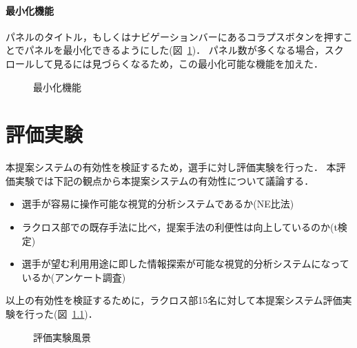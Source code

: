 \documentclass[sotsuron]{kuee}
\begin{document}
			\subsubsection{最小化機能}
				パネルのタイトル，もしくはナビゲーションバーにあるコラプスボタンを押すことでパネルを最小化できるようにした(図~\ref{fig:collapse})．
				パネル数が多くなる場合，スクロールして見るには見づらくなるため，この最小化可能な機能を加えた．
					\begin{figure}
						\begin{center}
						\end{center}
						\caption{最小化機能}
				  		\label{fig:collapse}
					\end{figure}

\chapter{評価実験}
	本提案システムの有効性を検証するため，選手に対し評価実験を行った．
	本評価実験では下記の観点から本提案システムの有効性について議論する．
	\begin{itemize}
		\item 選手が容易に操作可能な視覚的分析システムであるか(NE比法)
		\item ラクロス部での既存手法に比べ，提案手法の利便性は向上しているのか(t検定)
		\item 選手が望む利用用途に即した情報探索が可能な視覚的分析システムになっているか(アンケート調査)
	\end{itemize}
	以上の有効性を検証するために，ラクロス部15名に対して本提案システム評価実験を行った(図~\ref{fig:experi})．
		\begin{figure}
			\begin{center}
			\end{center}
			\caption{評価実験風景}
	  		\label{fig:experi}
		\end{figure}
\end{document}

